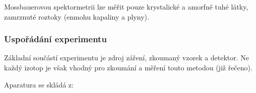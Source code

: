  
Mossbauerovou spektormetrii lze měřit pouze krystalické a amorfně tuhé látky, zamrznuté roztoky (enmohu kapaliny a plyny).

\subsubsection{Uspořádání experimentu}

Základní součástí experimentu je zdroj záření, zkoumaný vzorek a detektor. Ne každý izotop je však vhodný pro zkoumání a měření touto metodou (již řečeno).

Aparatura se skládá z:

